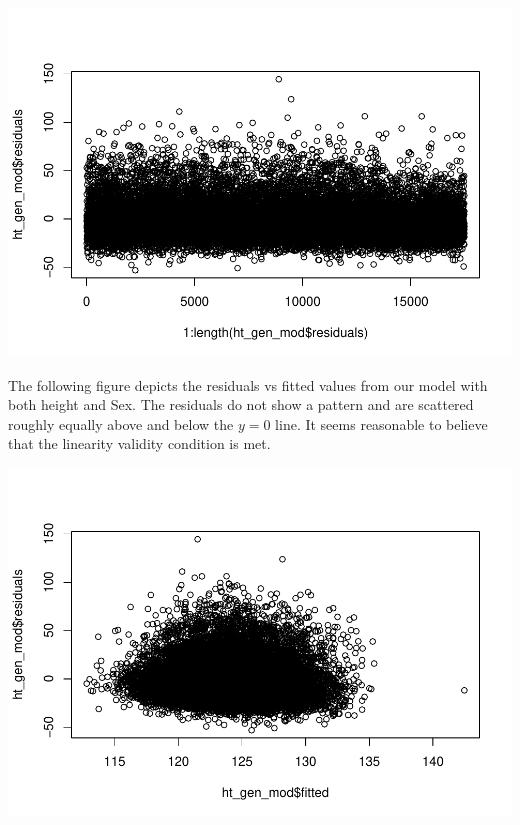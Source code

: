 \documentclass[]{book}
\newenvironment{Shaded}{\begin{snugshade}}{\end{snugshade}}
\newcommand{\KeywordTok}[1]{\textcolor[rgb]{0.13,0.29,0.53}{\textbf{#1}}}
\newcommand{\NormalTok}[1]{#1}
\newcommand{\OperatorTok}[1]{\textcolor[rgb]{0.81,0.36,0.00}{\textbf{#1}}}
\begin{document}
\includegraphics{MA206supplement_files/figure-latex/unnamed-chunk-7-1.pdf}

The following figure depicts the residuals vs fitted values from our model with both height and Sex. The residuals do not show a pattern and are scattered roughly equally above and below the \(y = 0\) line. It seems reasonable to believe that the linearity validity condition is met.

\begin{Shaded}
\end{Shaded}

\includegraphics{MA206supplement_files/figure-latex/unnamed-chunk-8-1.pdf}
\end{document}

